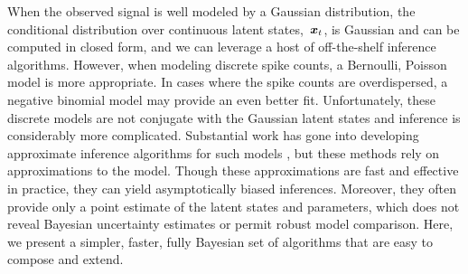 When the observed signal is well modeled by a Gaussian distribution, 
the conditional distribution over continuous latent states,~$\boldsymbol{x}_t$, is 
Gaussian and can be computed in closed form, and we can leverage a 
host of off-the-shelf inference algorithms. However, when modeling 
discrete spike counts, a Bernoulli, Poisson model is more appropriate. 
In cases where the spike counts are overdispersed, a negative binomial 
model may provide an even better fit. Unfortunately, these discrete models are not 
conjugate with the Gaussian latent states and inference is
considerably more complicated. Substantial work has gone into 
developing approximate inference algorithms for such models \citep{macke2011empirical},
but these methods rely on approximations to the model. 
Though these approximations are fast and effective in practice, they can yield
asymptotically biased inferences.
Moreover, they often provide only a point estimate of the latent states and
parameters, which does not reveal Bayesian uncertainty estimates or permit
robust model comparison. 
Here, we present a simpler, faster, fully Bayesian set of algorithms that
are easy to compose and extend.


